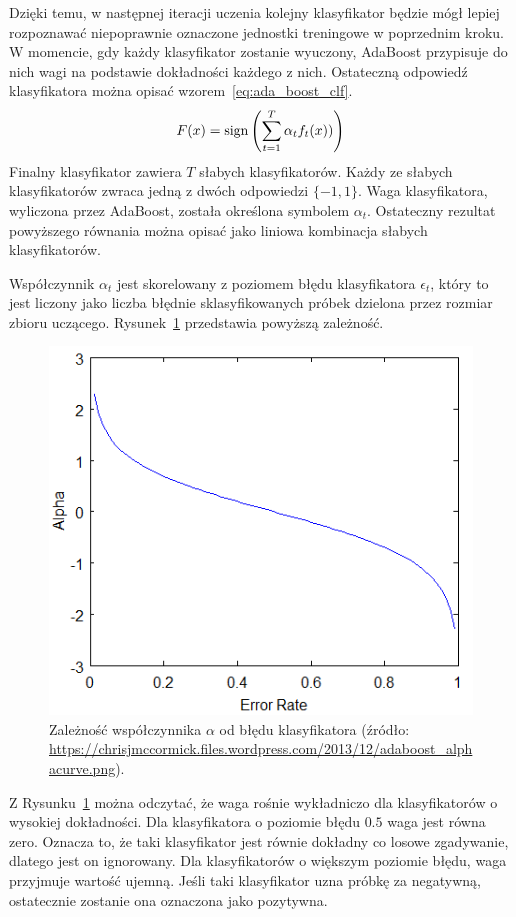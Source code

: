 Dzięki temu, w następnej iteracji uczenia kolejny klasyfikator będzie mógł lepiej rozpoznawać niepoprawnie oznaczone jednostki treningowe w poprzednim kroku.
W momencie, gdy każdy klasyfikator zostanie wyuczony, AdaBoost przypisuje do nich wagi na podstawie dokładności każdego z nich.
Ostateczną odpowiedź klasyfikatora można opisać wzorem~\eqref{eq:ada_boost_clf}.
\begin{equation}
    \label{eq:ada_boost_clf}
    F(x) = \operatorname{sign}\left(\sum_{t=1}^{T} \alpha_t f_t(x))\right)
\end{equation}
Finalny klasyfikator zawiera $T$ słabych klasyfikatorów.
Każdy ze słabych klasyfikatorów zwraca jedną z dwóch odpowiedzi $\{-1, 1\}$.
Waga klasyfikatora, wyliczona przez AdaBoost, została określona symbolem $\alpha_t$.
Ostateczny rezultat powyższego równania można opisać jako liniowa kombinacja słabych klasyfikatorów.

Współczynnik $\alpha_t$ jest skorelowany z poziomem błędu klasyfikatora $\epsilon_t$, który to jest liczony jako liczba błędnie sklasyfikowanych próbek dzielona przez rozmiar zbioru uczącego.
Rysunek~\ref{fig:adaboost_alphacurve} przedstawia powyższą zależność.
\begin{figure}[!ht]
    \centering
    \includegraphics[scale=0.6]{Pictures/adaboost_alphacurve}
    \caption{Zależność współczynnika $\alpha$ od błędu klasyfikatora (źródło: \url{https://chrisjmccormick.files.wordpress.com/2013/12/adaboost_alphacurve.png}).}
    \label{fig:adaboost_alphacurve}
\end{figure}
\FloatBarrier
Z Rysunku~\ref{fig:adaboost_alphacurve} można odczytać, że waga rośnie wykładniczo dla klasyfikatorów o wysokiej dokładności.
Dla klasyfikatora o poziomie błędu $0.5$ waga jest równa zero.
Oznacza to, że taki klasyfikator jest równie dokładny co losowe zgadywanie, dlatego jest on ignorowany.
Dla klasyfikatorów o większym poziomie błędu, waga przyjmuje wartość ujemną.
Jeśli taki klasyfikator uzna próbkę za negatywną, ostatecznie zostanie ona oznaczona jako pozytywna.

